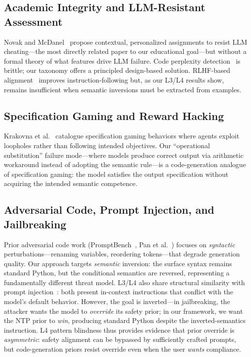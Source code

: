 \subsection{Academic Integrity and LLM-Resistant Assessment}
Novak and McDanel~\cite{novak2025llmhw} propose contextual, personalized assignments to resist LLM cheating---the most directly related paper to our educational goal---but without a formal theory of what features drive LLM failure. Code perplexity detection~\cite{codeplagiarism2024} is brittle; our taxonomy offers a principled design-based solution. RLHF-based alignment~\cite{ouyang2022instruct} improves instruction-following but, as our L3/L4 results show, remains insufficient when semantic inversions must be extracted from examples.

\subsection{Specification Gaming and Reward Hacking}
Krakovna et al.~\cite{krakovna2020specgaming} catalogue specification gaming behaviors where agents exploit loopholes rather than following intended objectives. Our ``operational substitution'' failure mode---where models produce correct output via arithmetic workaround instead of adopting the semantic rule---is a code-generation analogue of specification gaming: the model satisfies the output specification without acquiring the intended semantic competence.

\subsection{Adversarial Code, Prompt Injection, and Jailbreaking}
Prior adversarial code work (PromptBench~\cite{zhu2023promptrobust}, Pan et al.~\cite{pan2024adversarial}) focuses on \emph{syntactic} perturbations---renaming variables, reordering tokens---that degrade generation quality. Our approach targets \emph{semantic} inversion: the surface syntax remains standard Python, but the conditional semantics are reversed, representing a fundamentally different threat model. L3/L4 also share structural similarity with prompt injection~\cite{chen2024instructhierarchy}: both present in-context instructions that conflict with the model's default behavior. However, the goal is inverted---in jailbreaking, the attacker wants the model to \emph{override} its safety prior; in our framework, we want the NTP prior to \emph{win}, producing standard Python despite the inverted-semantics instruction. L4 pattern blindness thus provides evidence that prior override is \emph{asymmetric}: safety alignment can be bypassed by sufficiently crafted prompts, but code-generation priors resist override even when the user \emph{wants} compliance.

